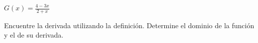 \item $G(x) = \frac{4 - 3x}{2 + x}$
\par
Encuentre la derivada utilizando la definición. Determine el dominio de la función y el de su derivada.
